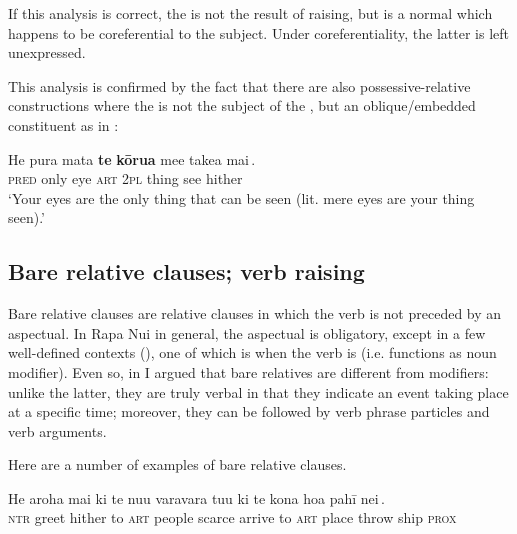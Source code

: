 If this analysis is correct, the  is not the result of raising, but is a normal   which happens to be coreferential to the  subject. Under coreferentiality, the latter is left unexpressed. 

This analysis is confirmed by the fact that there are also possessive-relative constructions where the  is not the subject of the , but an oblique/embed\-ded constituent as in :

\largerpage

\ea\label{ex:11.128}
\gll He pura mata \textbf{te} \textbf{kōrua} me{\ꞌ}e {\ob}take{\ꞌ}a mai\,{\cb}. \\
\textsc{pred} only eye \textsc{art} \textsc{2pl} thing {\db}see hither \\

\glt 
‘Your eyes are the only thing that can be seen (lit. mere eyes are your thing seen).’ \textstyleExampleref{[R245.217]}\textstyleExampleref{} 
\z
{}
\subsection{Bare relative clauses; verb raising}\label{sec:11.4.5}
Bare relative clauses are relative clauses in which the verb is not preceded by an aspectual. In Rapa Nui in general, the aspectual is obligatory, except in a few well-defined contexts (), one of which is when the verb is  (i.e. functions as noun modifier). Even so, in  I argued that bare relatives are different from  modifiers: unlike the latter, they are truly verbal in that they indicate an event taking place at a specific time; moreover, they can be followed by verb phrase particles and verb arguments. 

Here are a number of examples of bare relative clauses.

\ea\label{ex:11.129}
\gll He {\ꞌ}aroha mai ki te nu{\ꞌ}u varavara {\ob}tu{\ꞌ}u ki te kona hoa pahī nei\,{\cb}. \\
\textsc{ntr} greet hither to \textsc{art} people scarce {\db}arrive to \textsc{art} place throw ship \textsc{prox} \\


